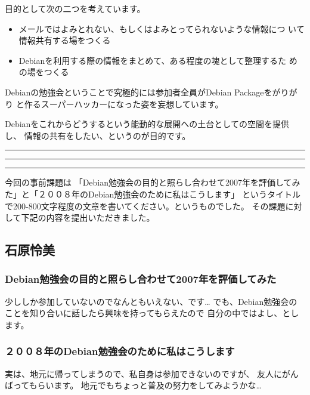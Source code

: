 \documentclass[mingoth,a4paper]{jsarticle}
\begin{document}
 目的として次の二つを考えています。

 \begin{itemize}
 \item メールではよみとれない、もしくはよみとってられないような情報につ
       いて情報共有する場をつくる
 \item Debianを利用する際の情報をまとめて、ある程度の塊として整理するた
       めの場をつくる
 \end{itemize}

 Debianの勉強会ということで究極的には参加者全員がDebian Packageをがりがり
 と作るスーパーハッカーになった姿を妄想しています。

 Debianをこれからどうするという能動的な展開への土台としての空間を提供し、
 情報の共有をしたい、というのが目的です。

\newpage

\begin{minipage}[b]{0.2\hsize}
 \colorbox{titleback}{}
\end{minipage}
\begin{minipage}[b]{0.8\hsize}
\hrule
\vspace{2mm}
\hrule
\tableofcontents
\vspace{2mm}
\hrule
\end{minipage}


今回の事前課題は
「Debian勉強会の目的と照らし合わせて2007年を評価してみた」と「２００８年のDebian勉強会のために私はこうします」
というタイトルで200-800文字程度の文章を書いてください。というものでした。
その課題に対して下記の内容を提出いただきました。

\subsection{石原怜美}

\subsubsection{Debian勉強会の目的と照らし合わせて2007年を評価してみた}
 少ししか参加していないのでなんともいえない、です…
 でも、Debian勉強会のことを知り合いに話したら興味を持ってもらえたので
 自分の中ではよし、とします。

\subsubsection{２００８年のDebian勉強会のために私はこうします}
 実は、地元に帰ってしまうので、私自身は参加できないのですが、
 友人にがんばってもらいます。
 地元でもちょっと普及の努力をしてみようかな…
\end{document}
